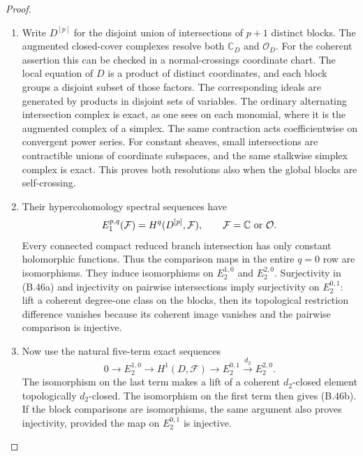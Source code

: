 \begin{proof}
\begin{enumerate}[label=\arabic*.,leftmargin=*]
\item Write $D^{[p]}$ for the disjoint union of intersections
of $p+1$ distinct blocks. The augmented closed-cover
complexes resolve both $\mathbb C_D$ and $\mathcal O_D$.
For the coherent assertion this can be checked in a
normal-crossings coordinate chart. The local equation
of $D$ is a product of distinct coordinates, and each
block groups a disjoint subset of those factors.
The corresponding ideals are generated by products
in disjoint sets of variables. The ordinary alternating
intersection complex is exact, as one sees on each
monomial, where it is the augmented complex of a
simplex. The same contraction acts coefficientwise
on convergent power series. For constant sheaves,
small intersections are contractible unions of
coordinate subspaces, and the same stalkwise simplex
complex is exact. This proves both resolutions also
when the global blocks are self-crossing.

\item Their hypercohomology spectral sequences have
\[
 E_1^{p,q}(\mathcal F)=H^q(D^{[p]},\mathcal F),
 \qquad \mathcal F=\mathbb C\ \hbox{or}\ \mathcal O.
\]
Every connected compact reduced branch intersection
has only constant holomorphic functions. Thus the
comparison maps in the entire $q=0$ row are
isomorphisms. They induce isomorphisms on
$E_2^{1,0}$ and $E_2^{2,0}$. Surjectivity in (B.46a)
and injectivity on pairwise intersections imply
surjectivity on $E_2^{0,1}$: lift a coherent
degree-one class on the blocks, then its topological
restriction difference vanishes because its coherent
image vanishes and the pairwise comparison is
injective.

\item Now use the natural five-term exact sequences
\[
 0\longrightarrow E_2^{1,0}
 \longrightarrow H^1(D,\mathcal F)
 \longrightarrow E_2^{0,1}
 \xrightarrow{d_2} E_2^{2,0}.
\]
The isomorphism on the last term makes a lift of a
coherent $d_2$-closed element topologically
$d_2$-closed. The isomorphism on the first term then
gives (B.46b). If the block comparisons are
isomorphisms, the same argument also proves
injectivity, provided the map on $E_2^{0,1}$ is
injective.


\end{enumerate}
\end{proof}
